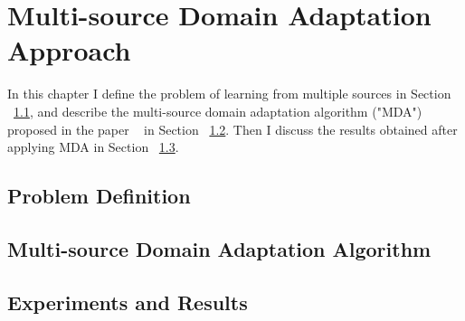 \cleardoublepage

\chapter{Multi-source Domain Adaptation Approach}
\label{mdachapter}

In this chapter I define the problem of learning from multiple sources in Section ~\ref{mdaproblemdefinitions}, and describe the multi-source domain adaptation algorithm ("MDA") proposed in the paper ~\citep{mda} in Section ~\ref{mdaalg}. Then I discuss the results obtained after applying MDA in Section ~\ref{mdaexperiments}.


\section{Problem Definition}
\label{mdaproblemdefinitions}


\section{Multi-source Domain Adaptation Algorithm}
\label{mdaalg}

\section{Experiments and Results}
\label{mdaexperiments}

